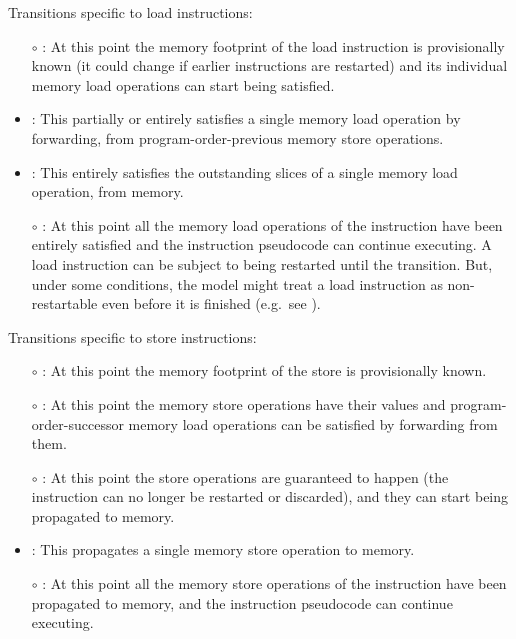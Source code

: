 \noindent Transitions specific to load instructions:
\begin{itemize}
\item[$\circ$] : At this point the memory
  footprint of the load instruction is provisionally known (it could change if
  earlier instructions are restarted) and its individual memory load operations can start being satisfied.
\item {}: This partially or entirely
  satisfies a single memory load operation by forwarding, from
  program-order-previous memory store operations.
\item {}: This entirely satisfies the outstanding slices of a single memory load operation, from memory.
\item[$\circ$] : At this point all the memory load operations of the instruction have been entirely satisfied and the instruction pseudocode can continue executing.
A load instruction can be subject to being restarted until the  transition.
But, under some conditions, the model might treat a load instruction as non-restartable even before it is finished (e.g.~see ).
\end{itemize}

\noindent Transitions specific to store instructions:
\begin{itemize}
\item[$\circ$] : At this point the memory footprint of the store is provisionally known.
\item[$\circ$] : At this point the memory store operations have their values and program-order-successor memory load operations can be satisfied by forwarding from them.
\item[$\circ$] : At this point the store operations are guaranteed to happen (the instruction can no longer be restarted or discarded), and they can start being propagated to memory.
\item {}: This propagates a single memory store operation to memory.
\item[$\circ$] : At this point all the memory store operations of the instruction have been propagated to memory, and the instruction pseudocode can continue executing.
\end{itemize}

